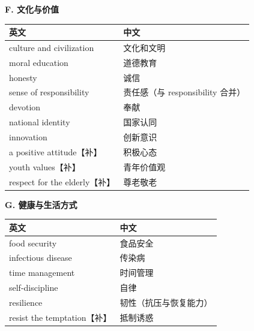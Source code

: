 \documentclass[11pt,a4paper]{ctexart}
\begin{document}
\par\addvspace{5pt}\noindent\textbf{F. 文化与价值}\par\addvspace{2pt}
\begin{longtable}{L{5.8cm}L{10.2cm}}
\toprule
\textbf{英文} & \textbf{中文} \\
\midrule
\endhead
culture and civilization & 文化和文明 \\
moral education & 道德教育 \\
honesty & 诚信 \\
sense of responsibility & 责任感（与 responsibility 合并） \\
devotion & 奉献 \\
national identity & 国家认同 \\
innovation & 创新意识 \\
a positive attitude【补】 & 积极心态 \\
youth values【补】 & 青年价值观 \\
respect for the elderly【补】 & 尊老敬老 \\
\bottomrule
\end{longtable}

\par\addvspace{5pt}\noindent\textbf{G. 健康与生活方式}\par\addvspace{2pt}
\begin{longtable}{L{5.8cm}L{10.2cm}}
\toprule
\textbf{英文} & \textbf{中文} \\
\midrule
\endhead
food security & 食品安全 \\
infectious disease & 传染病 \\
time management & 时间管理 \\
self-discipline & 自律 \\
resilience & 韧性（抗压与恢复能力） \\
resist the temptation【补】 & 抵制诱惑 \\
\bottomrule
\end{longtable}
\end{document}
